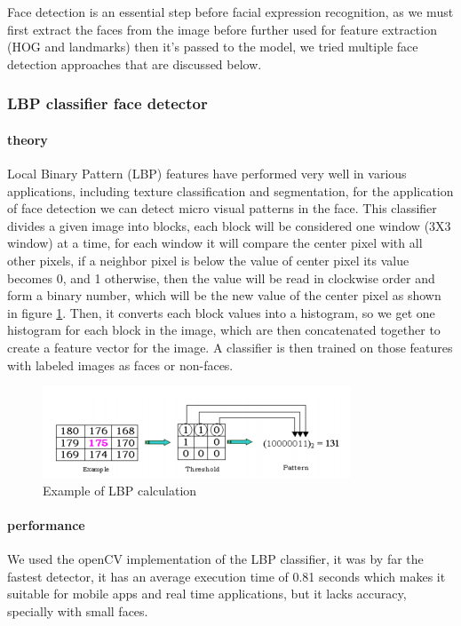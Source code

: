 Face detection is an essential step before facial expression recognition, as we must first extract the faces from the image before further used for feature extraction (HOG and landmarks) then it's passed to the model, we tried multiple face detection approaches that are discussed below.
\subsubsection{LBP classifier face detector}
\paragraph{theory}
Local Binary Pattern (LBP) features have performed very well in various applications, including texture classification and segmentation, for the application of face detection we can detect micro visual patterns in the face.\newline
This classifier divides a given image into blocks, each block will be considered one window (3X3 window) at a time, for each window it will compare the center pixel with all other pixels, if a neighbor pixel is below the value of center pixel its value becomes 0, and 1 otherwise, then the value will be read in clockwise order and form a binary number, which will be the new value of the center pixel as shown in figure \ref{fig:LBP_calculation}.\newline
Then, it converts each block values into a histogram, so we get one histogram for each block in the image, which are then concatenated together to create a feature vector for the image.\newline
A classifier is then trained on those features with labeled images as faces or non-faces.
\begin{figure}
	\centering
	\includegraphics{images/LBP_classifier.png}
	\caption{Example of LBP calculation}
	\label{fig:LBP_calculation}
\end{figure}

\paragraph{performance}
We used the openCV implementation of the LBP classifier, it was by far the fastest detector, it has an average execution time of 0.81 seconds which makes it suitable for mobile apps and real time applications, but it lacks accuracy, specially with small faces.


